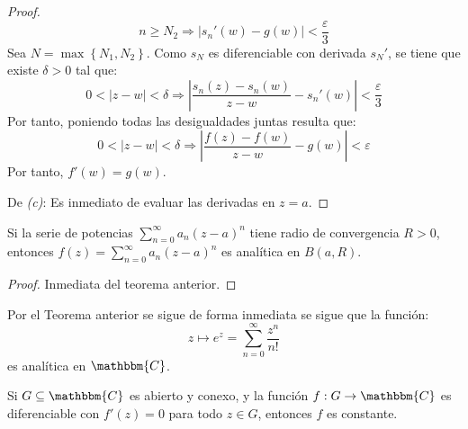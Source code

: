 \documentclass[12pt]{report}
\newcounter{it}
\theoremstyle{largebreak}
\newcommand\abs[1]{\ensuremath{\left|#1\right|}}
\newcommand\cf[3]{\ensuremath{#1:#2\rightarrow#3}}
\newcommand{\bbm}[1]{\ensuremath{\mathbbm{#1}}}
\begin{document}
\begin{proof}
        \begin{equation*}
            n\geq N_2\Rightarrow \abs{s_n'(w)-g(w)}<\frac{\varepsilon}{3}
        \end{equation*}
        Sea $N=\max\left\{N_1,N_2 \right\}$. Como $s_N$ es diferenciable con derivada $s_N'$, se tiene que existe $\delta>0$ tal que:
        \begin{equation*}
            0<\abs{z-w}<\delta\Rightarrow \abs{\frac{s_n(z)-s_n(w)}{z-w}-s_n'(w)}<\frac{\varepsilon}{3}
        \end{equation*}
        Por tanto, poniendo todas las desigualdades juntas resulta que:
        \begin{equation*}
            0<\abs{z-w}<\delta\Rightarrow\abs{\frac{f(z)-f(w)}{z-w}-g(w)}<\varepsilon
        \end{equation*}
        Por tanto, $f'(w)=g(w)$.

        De \textit{(c)}: Es inmediato de evaluar las derivadas en $z=a$.
    \end{proof}

    \begin{cor}
        Si la serie de potencias $\sum_{ n=0}^\infty a_n(z-a)^n$ tiene radio de convergencia $R>0$, entonces $f(z)=\sum_{ n=0}^\infty a_n(z-a)^n$ es analítica en $B(a,R)$.
    \end{cor}

    \begin{proof}
        Inmediata del teorema anterior.
    \end{proof}

    \begin{exa}
        Por el Teorema anterior se sigue de forma inmediata se sigue que la función:
        \begin{equation*}
            z\mapsto e^z=\sum_{ n=0}^\infty\frac{z^n}{n!}
        \end{equation*}
        es analítica en $\bbm{C}$.
    \end{exa}

    \begin{propo}
        Si $G\subseteq\bbm{C}$ es abierto y conexo, y la función $\cf{f}{G}{\bbm{C}}$ es diferenciable con $f'(z)=0$ para todo $z\in G$, entonces $f$ es constante.
    \end{propo}
\end{document}
